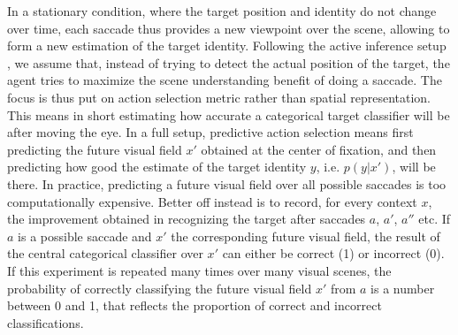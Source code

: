 In a stationary condition, where the target position and identity do not change over time, each saccade thus provides a new viewpoint over the scene, allowing to form a new estimation of the target identity.
Following the active inference setup \cite{Najemnik05, Friston12}, we assume  that, instead of trying to detect the actual position of the target, the agent tries to maximize the scene understanding benefit of doing a saccade. The focus is thus put on action selection metric rather than spatial representation.
This means in short estimating how accurate a categorical target classifier will be after moving the eye.
In a full setup, predictive action selection means first predicting the future visual field $x'$ obtained at the center of fixation, and then predicting how good the  %
estimate of the target identity $y$, i.e. $p(y|x')$, will be there.
In practice, %
predicting a future visual field over all possible saccades is too computationally expensive. %
Better off instead is to record, for every context $x$, the improvement obtained in recognizing the target after saccades $a$, $a'$, $a''$ etc.
If $a$ is a possible saccade and $x'$ the corresponding future visual field, the result of the central categorical classifier over $x'$ can either be correct (1) or incorrect (0).
If this experiment is repeated many times over many visual scenes, the probability of correctly classifying the future visual field $x'$ from $a$ is a number between 0 and 1, that reflects the proportion of correct and incorrect classifications.
